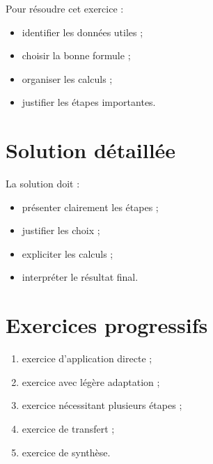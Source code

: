 \documentclass[11pt,a4paper]{article}
\begin{document}
\begin{cadreaide}
Pour résoudre cet exercice :

\begin{itemize}
    \item identifier les données utiles ;
    \item choisir la bonne formule ;
    \item organiser les calculs ;
    \item justifier les étapes importantes.
\end{itemize}
\end{cadreaide}

\section{Solution détaillée}

\begin{cadresolution}
La solution doit :
\begin{itemize}
    \item présenter clairement les étapes ;
    \item justifier les choix ;
    \item expliciter les calculs ;
    \item interpréter le résultat final.
\end{itemize}
\end{cadresolution}

\section{Exercices progressifs}

\begin{cadreactivite}
\begin{enumerate}
    \item exercice d’application directe ;
    \item exercice avec légère adaptation ;
    \item exercice nécessitant plusieurs étapes ;
    \item exercice de transfert ;
    \item exercice de synthèse.
\end{enumerate}
\end{cadreactivite}

\end{document}
